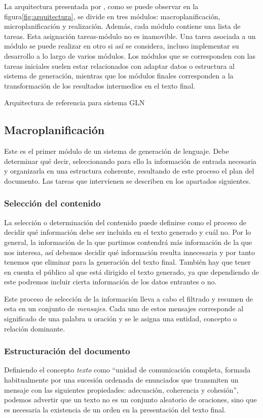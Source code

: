 La arquitectura presentada por \cite{reiter1997building}, como se puede observar en la figura\ref{fig:arquitectura}, se divide en tres módulos: macroplanificación, microplanificación y realización. Además, cada módulo contiene una lista de tareas. Esta asignación tareas-módulo no es inamovible. Una tarea asociada a un módulo se puede realizar en otro si así se considera, incluso implementar su desarrollo a lo largo de varios módulos. Los módulos que se corresponden con las tareas iniciales suelen estar relacionados con adaptar datos o estructura al sistema de generación, mientras que los módulos finales corresponden a la transformación de los resultados intermedios en el texto final.

%
{Arquitectura de referencia para sistema GLN \citep{vicente2015generacion}}

\subsection{Macroplanificación}
Este es el primer módulo de un sistema de generación de lenguaje. Debe determinar qué decir, seleccionando para ello la información de entrada necesaria y organizarla en una estructura coherente, resultando de este proceso el plan del documento. Las tareas que intervienen se describen en los apartados siguientes. 

\subsubsection{Selección del contenido}
La selección o determinación del contenido puede definirse como el proceso de decidir qué información debe ser incluida en el texto generado y cuál no. Por lo general, la información de la que partimos contendrá más información de la que nos interesa, así debemos decidir qué información resulta innecesaria y por tanto tenemos que eliminar para la generación del texto final. También hay que tener en cuenta el público al que está dirigido el texto generado, ya que dependiendo de este podremos incluir cierta información de los datos entrantes o no.

Este proceso de selección de la información lleva a cabo el filtrado y resumen de esta en un conjunto de \textit{mensajes}. Cada uno de estos mensajes corresponde al significado de una palabra u oración y se le asigna una entidad, concepto o relación dominante.

\subsubsection{Estructuración del documento}
Definiendo el concepto \textit{texto} como ``unidad de comunicación completa, formada habitualmente por una sucesión ordenada de enunciados que transmiten un mensaje con las siguientes propiedades: adecuación, coherencia y cohesión'', podemos advertir que un texto no es un conjunto aleatorio de oraciones, sino que es necesaria la existencia de un orden en la presentación del texto final.

